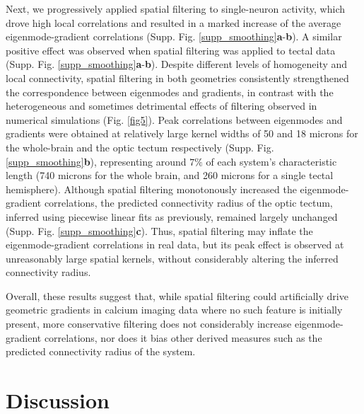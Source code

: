 \documentclass{article}
\begin{document}
Next, we progressively applied spatial filtering to single-neuron activity, which drove high local correlations and resulted in a marked increase of the average eigenmode-gradient correlations (Supp. Fig. \ref{supp_smoothing}\textbf{a}-\textbf{b}). A similar positive effect was observed when spatial filtering was applied to tectal data (Supp. Fig. \ref{supp_smoothing}\textbf{a}-\textbf{b}). Despite different levels of homogeneity and local connectivity, spatial filtering in both geometries consistently strengthened the correspondence between eigenmodes and gradients, in contrast with the heterogeneous and sometimes detrimental effects of filtering observed in numerical simulations (Fig. \ref{fig5}). Peak correlations between eigenmodes and gradients were obtained at relatively large kernel widths of 50 and 18 microns for the whole-brain and the optic tectum respectively (Supp. Fig. \ref{supp_smoothing}\textbf{b}), representing around $7\%$ of each system's characteristic length (740 microns for the whole brain, and 260 microns for a single tectal hemisphere). Although spatial filtering monotonously increased the eigenmode-gradient correlations, the predicted connectivity radius of the optic tectum, inferred using piecewise linear fits as previously, remained largely unchanged (Supp. Fig. \ref{supp_smoothing}\textbf{c}). Thus, spatial filtering may inflate the eigenmode-gradient correlations in real data, but its peak effect is observed at unreasonably large spatial kernels, without considerably altering the inferred connectivity radius.

Overall, these results suggest that, while spatial filtering could artificially drive geometric gradients in calcium imaging data where no such feature is initially present, more conservative filtering does not considerably increase eigenmode-gradient correlations, nor does it bias other derived measures such as the predicted connectivity radius of the system.

\section*{Discussion}

\end{document}
